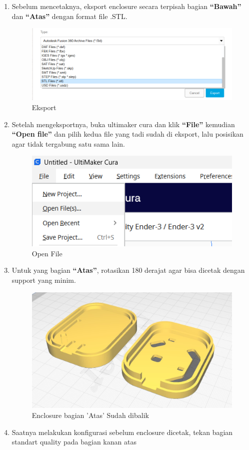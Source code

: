\begin{enumerate}
    \item Sebelum mencetaknya, eksport enclosure secara terpisah bagian
     \textbf{“Bawah”} dan \textbf{“Atas”} dengan format file .STL.
     \begin{figure}[H]
        \centering
        \includegraphics[width=0.5\linewidth]{P3/img/Eksport.png}
        \caption{Eksport}
        \label{fig:Eksport}
    \end{figure}
    \item Setelah mengeksportnya, buka ultimaker cura dan klik \textbf{“File”} kemudian 
    \textbf{“Open file”} dan pilih kedua file yang tadi sudah di eksport, 
    lalu posisikan agar tidak tergabung satu sama lain.
     \begin{figure}[H]
        \centering
        \includegraphics[width=0.5\linewidth]{P3/img/Open File.png}
        \caption{Open File}
        \label{fig:Open File}
    \end{figure}
    \item Untuk yang bagian \textbf{“Atas”}, rotasikan 180 derajat agar bisa dicetak dengan support yang minim.
    \begin{figure}[H]
       \centering
       \includegraphics[width=0.5\linewidth]{P3/img/Enclosure 3D 2.jpg}
       \caption{Enclosure bagian 'Atas' Sudah dibalik}
       \label{fig:Enclosure}
   \end{figure}
    \item Saatnya melakukan konfigurasi sebelum enclosure dicetak, tekan bagian standart quality pada bagian kanan atas 

\end{enumerate}
